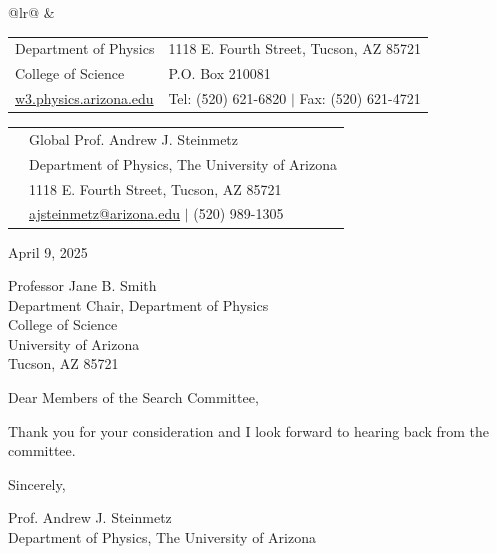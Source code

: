 \documentclass[11pt]{article}
\begin{document}

\noindent
\begin{tabular}{@{}lr@{}}
  &
  \begin{tabular}{@{}ll@{}}
    \footnotesize Department of Physics & \footnotesize 1118 E. Fourth Street, Tucson, AZ 85721\\
    \footnotesize College of Science & \footnotesize P.O. Box 210081\\
    \href{https://w3.physics.arizona.edu/}{\footnotesize w3.physics.arizona.edu} & \footnotesize Tel: (520) 621-6820 \(\vert\) Fax: (520) 621-4721
  \end{tabular}
\end{tabular}

\vspace{0em}
\noindent\hrulefill
\vspace{1em}

\noindent
\begin{tabular}{@{}p{7.0cm} p{9.0cm}@{}}
    & Global Prof. Andrew J. Steinmetz\\
    & Department of Physics, The University of Arizona\\
    & 1118 E. Fourth Street, Tucson, AZ 85721\\
    & \href{mailto:ajsteinmetz@arizona.edu}{ajsteinmetz@arizona.edu} \(\vert\) (520) 989-1305
\end{tabular}

\vspace{1em}

\noindent
April 9, 2025

\vspace{1em}

\noindent
Professor Jane B. Smith\\
Department Chair, Department of Physics\\
College of Science\\
University of Arizona\\
Tucson, AZ 85721

\vspace{2em}


\noindent
Dear Members of the Search Committee,

\noindent

Thank you for your consideration and I look forward to hearing back from the committee.


\vspace{1em}

\noindent
Sincerely,

\vspace{3em}

\noindent
Prof. Andrew J. Steinmetz\\
Department of Physics, The University of Arizona
\end{document}
